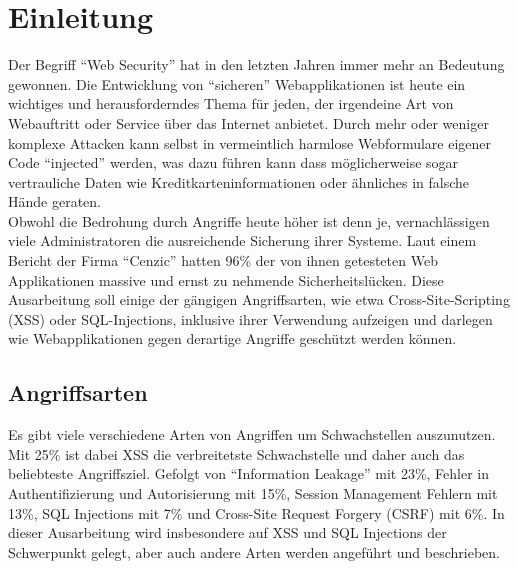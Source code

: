 \section{Einleitung}

Der Begriff ``Web Security'' hat in den letzten Jahren immer mehr an Bedeutung gewonnen. Die Entwicklung von ``sicheren'' Webapplikationen ist heute ein wichtiges und herausforderndes Thema f\"ur jeden, der irgendeine Art von Webauftritt oder Service \"uber das Internet anbietet. Durch mehr oder weniger komplexe Attacken kann selbst in vermeintlich harmlose Webformulare eigener Code ``injected'' werden, was dazu f\"uhren kann dass m\"oglicherweise sogar vertrauliche Daten wie Kreditkarteninformationen oder \"ahnliches in falsche H\"ande geraten.\\
Obwohl die Bedrohung durch Angriffe heute h\"oher ist denn je, vernachl\"assigen viele Administratoren die ausreichende Sicherung ihrer Systeme. Laut einem Bericht der Firma ``Cenzic'' hatten 96\% der von ihnen getesteten Web Applikationen massive und ernst zu nehmende Sicherheitsl\"ucken.\cite{vulnerabilityReport2014}
Diese Ausarbeitung soll einige der g\"angigen Angriffsarten, wie etwa Cross-Site-Scripting (XSS) oder SQL-Injections, inklusive ihrer Verwendung aufzeigen und darlegen wie Webapplikationen gegen derartige Angriffe gesch\"utzt werden k\"onnen.

\subsection{Angriffsarten}

Es gibt viele verschiedene Arten von Angriffen um Schwachstellen auszunutzen. Mit 25\% ist dabei XSS die verbreitetste Schwachstelle und daher auch das beliebteste Angriffsziel. Gefolgt von ``Information Leakage'' mit 23\%, Fehler in Authentifizierung und Autorisierung mit 15\%, Session Management Fehlern mit 13\%, SQL Injections mit 7\% und Cross-Site Request Forgery (CSRF) mit 6\%.\cite{vulnerabilityReport2014} In dieser Ausarbeitung wird insbesondere auf XSS und SQL Injections der Schwerpunkt gelegt, aber auch andere Arten werden angef\"uhrt und beschrieben.